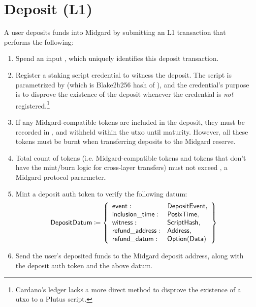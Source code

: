 \documentclass[../midgard.tex]{subfiles}
\begin{document}
\section{Deposit (L1)}
\label{h:deposit}

A user deposits funds into Midgard by submitting an L1 transaction that performs the following:
\begin{enumerate}
    \item Spend an input , which uniquely identifies this deposit transaction.
    \item Register a staking script credential to witness the deposit.
      The script is parametrized by  (which is Blake2b256 hash of ), and the credential's purpose is to disprove the existence of the deposit whenever the credential is \emph{not} registered.\footnote{Cardano's ledger lacks a more direct method to disprove the existence of a utxo to a Plutus script.}
    \item If any Midgard-compatible tokens are included in the deposit, they must be recorded in , and withheld within the utxo until maturity. However, all these tokens must be burnt when transferring deposits to the Midgard reserve.
    \item Total count of tokens (i.e. Midgard-compatible tokens and tokens that don't have the mint/burn logic for cross-layer transfers) must not exceed , a Midgard protocol pararmeter.
    \item Mint a deposit auth token to verify the following datum:
        \begin{equation*}
        \mathsf{DepositDatum} \coloneq \left\{
            \begin{array}{ll}
                \mathsf{event} : & \mathsf{DepositEvent}, \\
                \mathsf{inclusion\_time} : & \mathsf{PosixTime}, \\
                \mathsf{witness} : & \mathsf{ScriptHash}, \\
                \mathsf{refund\_address}: & \mathsf{Address}, \\
                \mathsf{refund\_datum}: & \mathsf{Option(Data)}
            \end{array}
            \right\}
        \end{equation*}
    \item Send the user's deposited funds to the Midgard deposit address, along with the deposit auth token and the above datum.
\end{enumerate}
\end{document}
